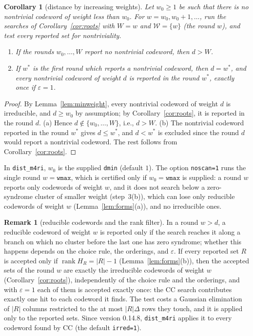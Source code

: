 \documentclass[11pt]{article}
\newtheorem{corollary}[theorem]{Corollary}
\theoremstyle{definition}
\newtheorem{remark}[theorem]{Remark}
\DeclareMathOperator{\rank}{rank}
\newcommand{\Wr}{\mathcal{W}}   %
\newcommand{\ttt}[1]{\texttt{#1}}
\begin{document}
\begin{corollary}[distance by increasing weights]\label{cor:ladder}
Let $w_0\ge1$ be such that there is no nontrivial codeword of weight less than $w_0$. For $w=w_0,w_0+1,\dots$, run the
searches of Corollary~\ref{cor:roots} with $W=w$ and $\Wr=\{w\}$ (the \emph{round} $w$), and test every reported set
for nontriviality.
\begin{enumerate}[label=(\alph*)]
  \item If the rounds $w_0,\dots,W$ report no nontrivial codeword, then $d>W$.
  \item If $w^*$ is the first round which reports a nontrivial codeword, then $d=w^*$, and every nontrivial codeword
    of weight $d$ is reported in the round $w^*$, exactly once if $\varepsilon=1$.
\end{enumerate}
\end{corollary}

\begin{proof}
By Lemma~\ref{lem:minweight}, every nontrivial codeword of weight $d$ is irreducible, and $d\ge w_0$ by assumption;
by Corollary~\ref{cor:roots}, it is reported in the round $d$. (a) Hence $d\notin\{w_0,\dots,W\}$, i.e., $d>W$.
(b) The nontrivial codeword reported in the round $w^*$ gives $d\le w^*$, and $d<w^*$ is excluded since the round $d$
would report a nontrivial codeword. The rest follows from Corollary~\ref{cor:roots}.
\end{proof}

In \ttt{dist\_m4ri}, $w_0$ is the supplied \ttt{dmin} (default $1$). The option \ttt{noscan=1} runs the single round
$w=\ttt{wmax}$, which is certified only if $w_0=\ttt{wmax}$ is supplied: a round $w$ reports only codewords of weight
$w$, and it does not search below a zero-syndrome cluster of smaller weight (step~3(b)), which can lose only reducible
codewords of weight $w$ (Lemma~\ref{lem:forms}(a)), and no irreducible ones.

\begin{remark}[reducible codewords and the rank filter]\label{rem:reducible}
In a round $w>d$, a reducible codeword of weight $w$ is reported only if the search reaches it along a branch on which
no cluster before the last one has zero syndrome; whether this happens depends on the choice rule, the orderings, and
$\varepsilon$. If every reported set $R$ is accepted only if $\rank H_R=|R|-1$ (Lemma~\ref{lem:forms}(b)), then the
accepted sets of the round $w$ are exactly the irreducible codewords of weight $w$ (Corollary~\ref{cor:roots}),
independently of the choice rule and the orderings, and with $\varepsilon=1$ each of them is accepted exactly once:
the CC search contributes exactly one hit to each codeword it finds. The test costs a Gaussian elimination of $|R|$
columns restricted to the at most $|R|\Delta$ rows they touch, and it is applied only to the reported sets. Since
version 0.14.8, \ttt{dist\_m4ri} applies it to every codeword found by CC (the default \ttt{irred=1}).
\end{remark}
\end{document}
